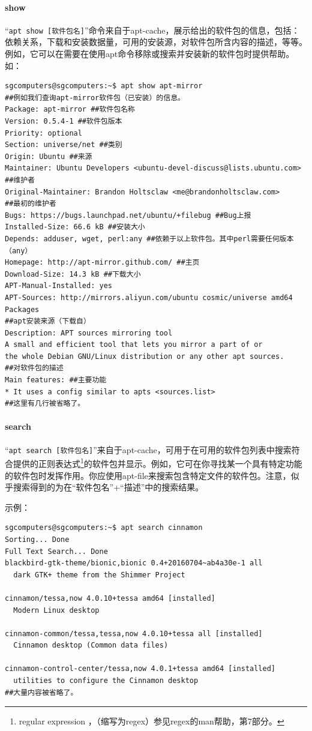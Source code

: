 \paragraph{show}
“\verb|apt show [软件包名]|”命令来自于apt-cache，展示给出的软件包的信息，包括：依赖关系，下载和安装数据量，可用的安装源，对软件包所含内容的描述，等等。例如，它可以在需要在使用apt命令移除或搜索并安装新的软件包时提供帮助。如：
\begin{verbatim}
sgcomputers@sgcomputers:~$ apt show apt-mirror
##例如我们查询apt-mirror软件包（已安装）的信息。
Package: apt-mirror ##软件包名称
Version: 0.5.4-1 ##软件包版本
Priority: optional
Section: universe/net ##类别
Origin: Ubuntu ##来源
Maintainer: Ubuntu Developers <ubuntu-devel-discuss@lists.ubuntu.com>
##维护者
Original-Maintainer: Brandon Holtsclaw <me@brandonholtsclaw.com>
##最初的维护者
Bugs: https://bugs.launchpad.net/ubuntu/+filebug ##Bug上报
Installed-Size: 66.6 kB ##安装大小
Depends: adduser, wget, perl:any ##依赖于以上软件包。其中perl需要任何版本（any）
Homepage: http://apt-mirror.github.com/ ##主页
Download-Size: 14.3 kB ##下载大小
APT-Manual-Installed: yes
APT-Sources: http://mirrors.aliyun.com/ubuntu cosmic/universe amd64 Packages
##apt安装来源（下载自）
Description: APT sources mirroring tool
A small and efficient tool that lets you mirror a part of or
the whole Debian GNU/Linux distribution or any other apt sources.
##对软件包的描述
Main features: ##主要功能
* It uses a config similar to apts <sources.list>
##这里有几行被省略了。
\end{verbatim}
\paragraph{search}
“\verb|apt search [软件包名]|”来自于apt-cache，可用于在可用的软件包列表中搜索符合提供的正则表达式\footnote{regular expression ，（缩写为regex）参见regex的man帮助，第7部分。}的软件包并显示。例如，它可在你寻找某一个具有特定功能的软件包时发挥作用。你应使用apt-file来搜索包含特定文件的软件包。注意，似乎搜索得到的为在“软件包名”+“描述”中的搜索结果。\par
示例：
\begin{verbatim}
sgcomputers@sgcomputers:~$ apt search cinnamon
Sorting... Done
Full Text Search... Done
blackbird-gtk-theme/bionic,bionic 0.4+20160704~ab4a30e-1 all
  dark GTK+ theme from the Shimmer Project

cinnamon/tessa,now 4.0.10+tessa amd64 [installed]
  Modern Linux desktop

cinnamon-common/tessa,tessa,now 4.0.10+tessa all [installed]
  Cinnamon desktop (Common data files)

cinnamon-control-center/tessa,now 4.0.1+tessa amd64 [installed]
  utilities to configure the Cinnamon desktop
##大量内容被省略了。
\end{verbatim}
